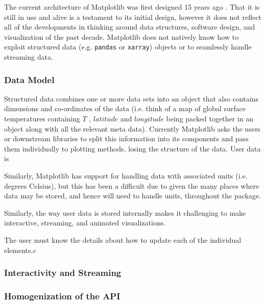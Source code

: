 \documentclass[11pt]{article}  %
\begin{document}
The current architecture of Matplotlib was first designed 15 years ago
\cite{Hunter:2007}.  That it is still in use and alive is a testament
to its initial design, however it does not reflect all of the
developments in thinking around data structures, software design, and
visualization of the past decade.  Matplotlib does not natively know
how to exploit structured data (e.g. \texttt{pandas} or
\texttt{xarray}) objects or to seamlessly handle streaming data.

\subsubsection{Data Model}

Structured data combines one or more data sets into an object that
also contains dimensions and co-ordinates of the data (i.e. think of a
map of global surface temperatures containing $T$ , $latitude$ and
$longitude$ being packed together in an object along with all the
relevant meta data).  Currently Matplotlib asks the users or
downstream libraries to split this information into its components and
pass them individually to plotting methods, losing the structure of
the data.  User data is

Similarly, Matplotlib has support for handling data with associated
units (i.e. degrees Celsius), but this has been a difficult due to
given the many places where data may be stored, and hence will need to
handle units, throughout the package.

Similarly, the way user data is
stored internally makes it challenging to make interactive, streaming,
and animated visualizations.

The user must know the details about how
to update each of the individual elements.c

\subsubsection{Interactivity and Streaming}
\subsubsection{Homogenization of the API}
\end{document}
